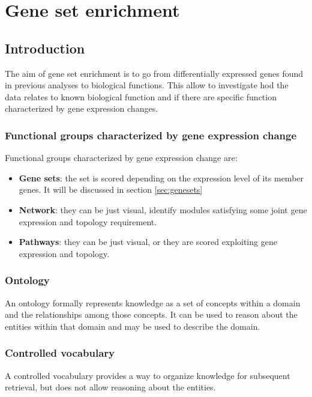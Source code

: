 \graphicspath{{chapters/06/images/}}
\chapter{Gene set enrichment}
	\section{Introduction}
	The aim of gene set enrichment is to go from differentially expressed genes found in previous analyses to biological functions.
	This allow to investigate hod the data relates to known biological function and if there are specific function characterized by gene expression changes.

	\subsection{Functional groups characterized by gene expression change}
	Functional groups characterized by gene expression change are:

	\begin{multicols}{2}
		\begin{itemize}
			\item \textbf{Gene sets}: the set is scored depending on the expression level of its member genes. It will be discussed in section \ref{sec:genesets}
			\item \textbf{Network}: they can be just visual, identify modules satisfying some joint gene expression and topology requirement.
			\item \textbf{Pathways}: they can be just visual, or they are scored exploiting gene expression and topology.
		\end{itemize}
	\end{multicols}

	\subsection{Ontology}
	An ontology formally represents knowledge as a set of concepts within a domain and the relationships among those concepts.
	It can be used to reason about the entities within that domain and may be used to describe the domain.

	\subsection{Controlled vocabulary}
	A controlled vocabulary provides a way to organize knowledge for subsequent retrieval, but does not allow reasoning about the entities.

